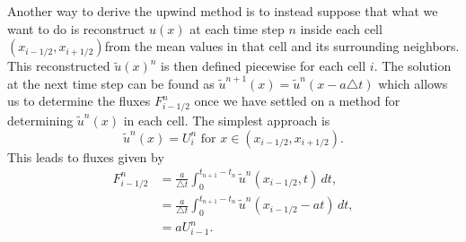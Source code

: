 Another way to derive the upwind method is to instead suppose that what we want to do is reconstruct $u(x)$ at each time step $n$ inside each cell $(x_{i-1/2},x_{i+1/2})$from the mean values in that cell and its surrounding neighbors. This reconstructed $\tilde{u}(x)^n$ is then defined piecewise for each cell $i$. The solution at the next time step can be found as $\tilde{u}^{n+1}(x) = \tilde{u}^n(x-a\triangle t)$ which allows us to determine the fluxes $F^n_{i-1/2}$ once we have settled on a method for determining $\tilde{u}^n(x)$ in each cell. The simplest approach is 
\[ \tilde{u}^n(x) = U_i^n \text{ for }x \in (x_{i-1/2},x_{i+1/2}). \]
This leads to fluxes given by 
\begin{align}
F_{i-1/2}^n &= \frac{a}{\triangle t}\int_{0}^{t_{n+1}-t_n} \tilde{u}^n(x_{i-1/2},t)\, dt , \\
&= \frac{a}{\triangle t}\int_{0}^{t_{n+1}-t_n} \tilde{u}^n(x_{i-1/2}-at)\, dt  ,\\
&= aU_{i-1}^n.\nonumber
\end{align}


